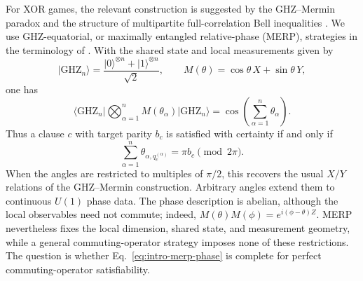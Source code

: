 \documentclass[11pt]{article}
\theoremstyle{definition}
\theoremstyle{remark}
\numberwithin{equation}{section}
\begin{document}
For XOR games, the relevant construction is suggested by the GHZ--Mermin
paradox and the structure of multipartite full-correlation Bell inequalities
\cite{GreenbergerHorneShimonyZeilinger1990,Mermin1990,WernerWolf2001}.  We use
GHZ-equatorial, or maximally entangled relative-phase (MERP), strategies in the
terminology of \cite{WattsHarrowKanwarNatarajan2019}.  With the shared state and local measurements given by
\[
  \lvert\mathrm{GHZ}_n\rangle
  =\frac{\lvert0\rangle^{\otimes n}+\lvert1\rangle^{\otimes n}}{\sqrt2},
  \qquad
  M(\theta)=\cos\theta\,X+\sin\theta\,Y,
\]
one has
\begin{equation}\label{eq:intro-ghz-correlator}
  \bigl\langle\mathrm{GHZ}_n\bigr\rvert
  \bigotimes_{\alpha=1}^{n}M(\theta_\alpha)
  \bigl\lvert\mathrm{GHZ}_n\bigr\rangle
  =\cos\!\left(\sum_{\alpha=1}^{n}\theta_\alpha\right).
\end{equation}
Thus a clause \(c\) with target parity \(b_c\) is satisfied with certainty if
and only if
\begin{equation}\label{eq:intro-merp-phase}
  \sum_{\alpha=1}^{n}\theta_{\alpha,q_c^{(\alpha)}}
  =\pi b_c\pmod{2\pi}.
\end{equation}
When the angles are restricted to multiples of \(\pi/2\),
this recovers the usual \(X/Y\) relations of the GHZ--Mermin construction.
Arbitrary angles extend them to continuous \(U(1)\) phase data.  The phase
description is abelian, although the local observables need not commute;
indeed, $M(\theta)M(\phi)=e^{i(\phi-\theta)Z}.$ MERP nevertheless fixes the local dimension, shared state, and measurement
geometry, while a general commuting-operator strategy imposes none of these
restrictions.
The question is whether Eq.~\eqref{eq:intro-merp-phase} is complete for perfect
commuting-operator satisfiability.
\end{document}
